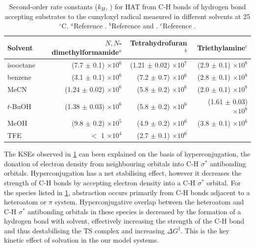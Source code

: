 \begin{table}[htb]
{\footnotesize
\centering
  \begin{tabular}{l r r r}
    Solvent & $N,N$-dimethylformamide$^a$ & Tetrahydrofuran$^b$ & Triethylamine$^c$ \\
    \hline
    \hline
    isooctane & (7.7 $\pm$ 0.1) $\times 10^6$ & (1.21 $\pm$ 0.02) $\times 10^7$ & \rule{0pt}{3ex} (2.9 $\pm$ 0.1) $\times 10^8$  \\
    benzene & (3.1 $\pm$ 0.1) $\times 10^6$ & (7.2 $\pm$ 0.7) $\times 10^6$ & (2.8 $\pm$ 0.1) $\times 10^8$ \\
    MeCN & (1.24 $\pm$ 0.02) $\times 10^6$ & (5.8 $\pm$ 0.2) $\times 10^6$ & (2.0 $\pm$ 0.1) $\times 10^8$ \\
    $t$-BuOH & (1.38 $\pm$ 0.03) $\times 10^6$ & (5.8 $\pm$ 0.2) $\times 10^6$ & (1.61 $\pm$ 0.03) $\times 10^8$ \\
    MeOH & (9.8 $\pm$ 0.2) $\times 10^5$ & (4.9 $\pm$ 0.2) $\times 10^6$ & (3.8 $\pm$ 0.1) $\times 10^6$ \\
    TFE & $<$ 1 $\times 10^4$ & (2.7 $\pm$ 0.1) $\times 10^6$ & \\
  \end{tabular}
  \caption[Summary of second-order rate constants for HAT from C-H bonds for
  hydrogen bond accepting substrates from the cumyloxyl radical.]{Second-order
    rate constants ($k_H$, \Ms) for HAT from C-H bonds of hydrogen bond
    accepting substrates to the cumyloxyl radical measured in different
    solvents at 25 $^{\circ}$C. $^a$Reference
    . $^b$Reference  and
    . $^c$Reference .}
  \label{tab:kse}
}
\end{table}


The KSEs observed in \ref{tab:kse} can been explained on the basis of
hyperconjugation, the donation of electron density from neighbouring orbitals
into C-H $\sigma^*$ antibonding orbitals. Hyperconjugation has a net stabilising
effect, however it decreases the strength of C-H bonds by accepting electron
density into a C-H $\sigma^*$ orbital. For the species listed in \ref{tab:kse},
abstraction occurs primarily from C-H bonds adjacent to a heteroatom or $\pi$
system. Hyperconjugative overlap between the heteroatom and C-H $\sigma^*$
antibonding orbitals in these species is decreased by the formation of a
hydrogen bond with solvent, effectively increasing the strength of the C-H bond
and thus destabilising the TS complex and increasing $\Delta G^{\ddagger}$. This
is the key kinetic effect of solvation in the our model systems.


